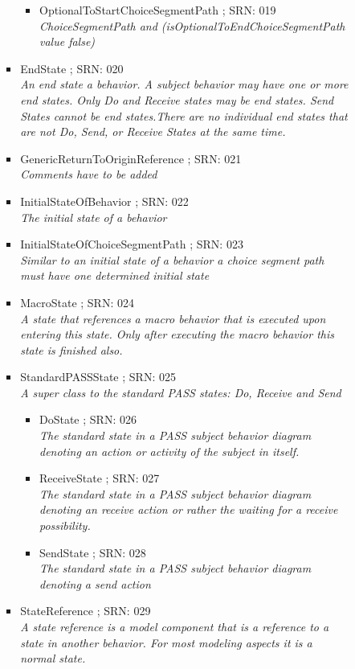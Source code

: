 \begin{itemize}
\begin{itemize}
\begin{itemize}
\begin{itemize}
\begin{itemize}
				\item OptionalToStartChoiceSegmentPath ; SRN: 019 \\ \textit{ChoiceSegmentPath and (isOptionalToEndChoiceSegmentPath value false)}
			\end{itemize}
			\item EndState ; SRN: 020 \\ \textit{An end state a behavior. A subject behavior may have one or more end states. Only Do and Receive states may be end states. Send States cannot be end states.There are no individual end states that are not Do, Send, or Receive States at the same time.}
			\item GenericReturnToOriginReference ; SRN: 021 \\ \textit{Comments have to be added}
			\item InitialStateOfBehavior ; SRN: 022 \\ \textit{The initial state of a behavior}
			\item InitialStateOfChoiceSegmentPath ; SRN: 023 \\ \textit{Similar to an initial state of a behavior a choice segment path must have one determined initial state}
			\item MacroState ; SRN: 024 \\ \textit{A state that references a macro behavior that is executed upon entering this state. Only after executing the macro behavior this state is finished also.}
			\item StandardPASSState ; SRN: 025 \\ \textit{A super class to the standard PASS states: Do, Receive and Send}
			\begin{itemize}
				\item DoState ; SRN: 026 \\ \textit{The standard state in a PASS subject behavior diagram denoting an action or activity of the subject in itself.}
				\item ReceiveState ; SRN: 027 \\ \textit{The standard state in a PASS subject behavior diagram denoting an receive action or rather the waiting for a receive possibility.}
				\item SendState ; SRN: 028 \\ \textit{The standard state in a PASS subject behavior diagram denoting a send action}
			\end{itemize}
			\item StateReference ; SRN: 029 \\ \textit{A state reference is a model component that is a reference to a state in another behavior. For most modeling aspects it is a normal state.}

\end{itemize}
\end{itemize}
\end{itemize}
\end{itemize}
